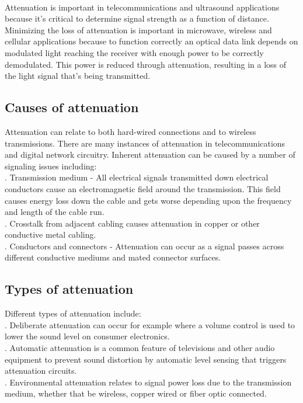 \documentclass[12pt,a4paper]{article}%
\begin{document}
\begin{flushleft}
\begin{flushleft}
		\paragraph{}
		Attenuation is important in telecommunications and ultrasound applications because it’s critical to determine signal strength as a function of distance. Minimizing the loss of attenuation is important in microwave, wireless and cellular applications because to function correctly an optical data link depends on modulated light reaching the receiver with enough power to be correctly demodulated. This power is reduced through attenuation, resulting in a loss of the light signal that’s being transmitted.
		\end{flushleft}
		\subsection{ Causes of attenuation} 
		\begin{flushleft}
		Attenuation can relate to both hard-wired connections and to wireless transmissions. There are many instances of attenuation in telecommunications and digital network circuitry. Inherent attenuation can be caused by a number of signaling issues including:\\. Transmission medium - All electrical signals transmitted down electrical conductors cause an electromagnetic field around the transmission. This field causes energy loss down the cable and gets worse depending upon the frequency and length of the cable run. \\.  Crosstalk from adjacent cabling causes attenuation in copper or other conductive metal cabling.\\. Conductors and connectors - Attenuation can occur as a signal passes across different conductive mediums and mated connector surfaces.\\\bigskip
		\end{flushleft}
		\subsection{Types of attenuation} 
		\begin{flushleft}
		Different types of attenuation include:\\. Deliberate attenuation can occur for example where a volume control is used to lower the sound level on consumer electronics.\\. Automatic attenuation is a common feature of televisions and other audio equipment to prevent sound distortion by automatic level sensing that triggers attenuation circuits.\\. Environmental attenuation relates to signal power loss due to the transmission medium, whether that be wireless, copper wired or fiber optic connected.
		\end{flushleft}
		

\end{flushleft}
\end{document}
